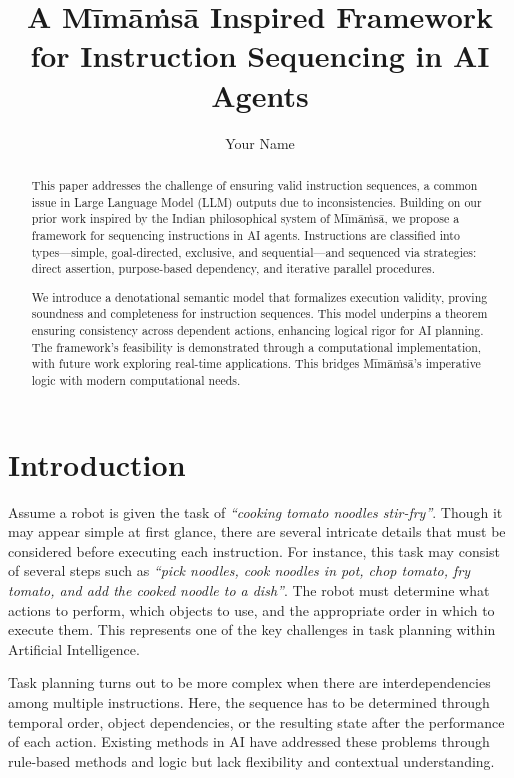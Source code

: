 \documentclass[a4paper,11pt]{lmcs}
\title{A M\={i}m\={a}\.{m}s\={a} Inspired Framework for Instruction Sequencing in AI Agents}
\author{Your Name}
\newcommand{\mimamsa}{M\={i}m\={a}\.ms\={a}}
\begin{document}
\maketitle

\begin{abstract}
This paper addresses the challenge of ensuring valid instruction sequences, a common issue in Large Language Model (LLM) outputs due to inconsistencies. Building on our prior work inspired by the Indian philosophical system of \mimamsa, we propose a framework for sequencing instructions in AI agents. Instructions are classified into types—simple, goal-directed, exclusive, and sequential—and sequenced via strategies: direct assertion, purpose-based dependency, and iterative parallel procedures.

We introduce a denotational semantic model that formalizes execution validity, proving soundness and completeness for instruction sequences. This model underpins a theorem ensuring consistency across dependent actions, enhancing logical rigor for AI planning. The framework’s feasibility is demonstrated through a computational implementation, with future work exploring real-time applications. This bridges \mimamsa's imperative logic with modern computational needs.
\end{abstract}

\section{Introduction}
Assume a robot is given the task of \textit{``cooking tomato noodles stir-fry''}. Though it may appear simple at first glance, there are several intricate details that must be considered before executing each instruction. For instance, this task may consist of several steps such as \textit{``pick noodles, cook noodles in pot, chop tomato, fry tomato, and add the cooked noodle to a dish''}. The robot must determine what actions to perform, which objects to use, and the appropriate order in which to execute them. This represents one of the key challenges in task planning within Artificial Intelligence.

Task planning turns out to be more complex when there are interdependencies among multiple instructions. Here, the sequence has to be determined through temporal order, object dependencies, or the resulting state after the performance of each action. Existing methods in AI have addressed these problems through rule-based methods and logic but lack flexibility and contextual understanding.
\end{document}
